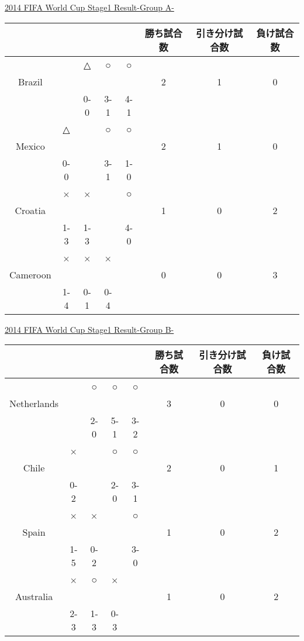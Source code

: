 \documentclass[a4j] {jarticle}
\begin{document}
		\begin{table}[htb]
		\begin{center}
		\underline{2014 FIFA World Cup Stage1 Result-Group A-}
		\begin{tabular}{|c|c|c|c|c|c|c|c|}
		\hline
		\multicolumn{1}{|c|}{} &
		\multicolumn{1}{c|}{} &
		\multicolumn{1}{c|}{} &
		\multicolumn{1}{c|}{} &
		\multicolumn{1}{c|}{} &
		\multicolumn{1}{c|}{勝ち試合数} &
		\multicolumn{1}{c|}{引き分け試合数} &
		\multicolumn{1}{c|}{負け試合数} \\
		\hline
 &  & △ & ○ & ○ & & & \\ 
Brazil & & & & & 2 & 1 & 0 \\ 
 & & 0-0 & 3-1 & 4-1 &  & & \\ 
 \hline
 & △ &  & ○ & ○ & & & \\ 
Mexico & & & & & 2 & 1 & 0 \\ 
 &0-0 &  & 3-1 & 1-0 &  & & \\ 
 \hline
 & × & × &  & ○ & & & \\ 
Croatia & & & & & 1 & 0 & 2 \\ 
 &1-3 & 1-3 &  & 4-0 &  & & \\ 
 \hline
 & × & × & × &  & & & \\ 
Cameroon & & & & & 0 & 0 & 3 \\ 
 &1-4 & 0-1 & 0-4 &  &  & & \\ 
 \hline
		\end{tabular}
		\end{center}
		\end{table}
		\newpage
		\begin{table}[htb]
		\begin{center}
		\underline{2014 FIFA World Cup Stage1 Result-Group B-}
		\begin{tabular}{|c|c|c|c|c|c|c|c|}
		\hline
		\multicolumn{1}{|c|}{} &
		\multicolumn{1}{c|}{} &
		\multicolumn{1}{c|}{} &
		\multicolumn{1}{c|}{} &
		\multicolumn{1}{c|}{} &
		\multicolumn{1}{c|}{勝ち試合数} &
		\multicolumn{1}{c|}{引き分け試合数} &
		\multicolumn{1}{c|}{負け試合数} \\
		\hline
 &  & ○ & ○ & ○ & & & \\ 
Netherlands & & & & & 3 & 0 & 0 \\ 
 & & 2-0 & 5-1 & 3-2 &  & & \\ 
 \hline
 & × &  & ○ & ○ & & & \\ 
Chile & & & & & 2 & 0 & 1 \\ 
 &0-2 &  & 2-0 & 3-1 &  & & \\ 
 \hline
 & × & × &  & ○ & & & \\ 
Spain & & & & & 1 & 0 & 2 \\ 
 &1-5 & 0-2 &  & 3-0 &  & & \\ 
 \hline
 & × & ○ & × &  & & & \\ 
Australia & & & & & 1 & 0 & 2 \\ 
 &2-3 & 1-3 & 0-3 &  &  & & \\ 
 \hline
		\end{tabular}
		\end{center}
		\end{table}
\end{document}
